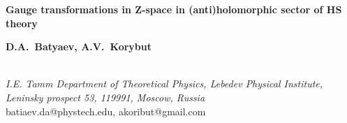 \documentclass[12pt]{article}
\begin{document}
\begin{flushright}
\end{flushright}

\vspace{0.5cm}
\begin{center}
{\large\bf Gauge transformations in Z-space in (anti)holomorphic sector of HS theory}

\vspace{1 cm}

\textbf{D.A.~Batyaev, A.V.~Korybut}\\

\vspace{1 cm}

\textbf{}\textbf{}\\
 \vspace{0.5cm}
 \textit{I.E. Tamm Department of Theoretical Physics,
Lebedev Physical Institute,}\\
 \textit{ Leninsky prospect 53, 119991, Moscow, Russia }\\
\vspace{0.7 cm} batiaev.da@phystech.edu, akoribut@gmail.com
\par\end{center}



\begin{center}
\vspace{0.6cm}

\par\end{center}

\vspace{0.4cm}
\end{document}
